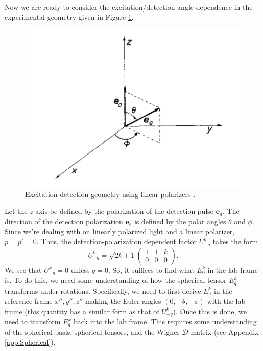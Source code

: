 \documentclass[11pt]{article}
\newcommand{\tj}[6]{ \begin{pmatrix}
		#1 & #2 & #3 \\
		#4 & #5 & #6 
\end{pmatrix}}
\begin{document}
Now we are ready to consider the excitation/detection angle dependence in the experimental geometry given in Figure \ref{fig:scheme1}.
\begin{figure}[!htb]
	\centering
	\includegraphics[scale=0.7]{beats_1}
	\caption{ Excitation-detection geometry using linear polarizers \cite{Luypaert_1977}.}
	\label{fig:scheme1}
\end{figure}
Let the $z$-axis be defined by the polarization of the detection pulse $\mathbf{e}_d$. The direction of the detection polarization $\mathbf{e}_e$ is defined by the polar angles $\theta$ and $\phi$. Since we're dealing with on linearly polarized light and a linear polarizer, $p = p' = 0$. Thus, the detection-polarization dependent factor $U^k_{-q}$ takes the form
\begin{equation*}
U^k_{-q} = \sqrt{2k+1}\tj{1}{1}{k}{0}{0}{0}.
\end{equation*} 
We see that $U^k_{-q} = 0$ unless $q = 0$. So, it suffices to find what $E^k_0$ in the lab frame is. To do this, we need some understanding of how the spherical tensor $E_q^k$ transforms under rotations. Specifically, we need to first derive $E^k_q$ in the reference frame $x'',y'',z''$ making the Euler angles $(0,-\theta,-\phi)$ with the lab frame (this quantity has a similar form as that of $U^k_{-q}$). Once this is done, we need to transform $E^k_q$ back into the lab frame. This requires some understanding of the spherical basis, spherical tensors, and the Wigner $\mathcal{D}$-matrix (see Appendix \ref{app:Spherical}). 
\end{document}
